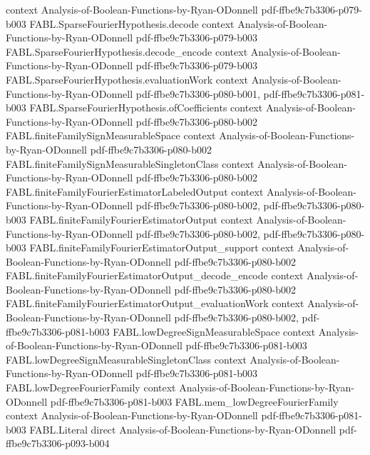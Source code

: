 \begin{theorem}
  {context}
  {Analysis-of-Boolean-Functions-by-Ryan-ODonnell}
  {pdf-ffbe9c7b3306-p079-b003}
\proofstep
  {FABL.SparseFourierHypothesis.decode}
  {context}
  {Analysis-of-Boolean-Functions-by-Ryan-ODonnell}
  {pdf-ffbe9c7b3306-p079-b003}
\proofstep
  {FABL.SparseFourierHypothesis.decode_encode}
  {context}
  {Analysis-of-Boolean-Functions-by-Ryan-ODonnell}
  {pdf-ffbe9c7b3306-p079-b003}
\proofstep
  {FABL.SparseFourierHypothesis.evaluationWork}
  {context}
  {Analysis-of-Boolean-Functions-by-Ryan-ODonnell}
  {pdf-ffbe9c7b3306-p080-b001,
    pdf-ffbe9c7b3306-p081-b003}
\proofstep
  {FABL.SparseFourierHypothesis.ofCoefficients}
  {context}
  {Analysis-of-Boolean-Functions-by-Ryan-ODonnell}
  {pdf-ffbe9c7b3306-p080-b002}
\proofstep
  {FABL.finiteFamilySignMeasurableSpace}
  {context}
  {Analysis-of-Boolean-Functions-by-Ryan-ODonnell}
  {pdf-ffbe9c7b3306-p080-b002}
\proofstep
  {FABL.finiteFamilySignMeasurableSingletonClass}
  {context}
  {Analysis-of-Boolean-Functions-by-Ryan-ODonnell}
  {pdf-ffbe9c7b3306-p080-b002}
\proofstep
  {FABL.finiteFamilyFourierEstimatorLabeledOutput}
  {context}
  {Analysis-of-Boolean-Functions-by-Ryan-ODonnell}
  {pdf-ffbe9c7b3306-p080-b002,
    pdf-ffbe9c7b3306-p080-b003}
\proofstep
  {FABL.finiteFamilyFourierEstimatorOutput}
  {context}
  {Analysis-of-Boolean-Functions-by-Ryan-ODonnell}
  {pdf-ffbe9c7b3306-p080-b002,
    pdf-ffbe9c7b3306-p080-b003}
\proofstep
  {FABL.finiteFamilyFourierEstimatorOutput_support}
  {context}
  {Analysis-of-Boolean-Functions-by-Ryan-ODonnell}
  {pdf-ffbe9c7b3306-p080-b002}
\proofstep
  {FABL.finiteFamilyFourierEstimatorOutput_decode_encode}
  {context}
  {Analysis-of-Boolean-Functions-by-Ryan-ODonnell}
  {pdf-ffbe9c7b3306-p080-b002}
\proofstep
  {FABL.finiteFamilyFourierEstimatorOutput_evaluationWork}
  {context}
  {Analysis-of-Boolean-Functions-by-Ryan-ODonnell}
  {pdf-ffbe9c7b3306-p080-b002,
    pdf-ffbe9c7b3306-p081-b003}
\proofstep
  {FABL.lowDegreeSignMeasurableSpace}
  {context}
  {Analysis-of-Boolean-Functions-by-Ryan-ODonnell}
  {pdf-ffbe9c7b3306-p081-b003}
\proofstep
  {FABL.lowDegreeSignMeasurableSingletonClass}
  {context}
  {Analysis-of-Boolean-Functions-by-Ryan-ODonnell}
  {pdf-ffbe9c7b3306-p081-b003}
\proofstep
  {FABL.lowDegreeFourierFamily}
  {context}
  {Analysis-of-Boolean-Functions-by-Ryan-ODonnell}
  {pdf-ffbe9c7b3306-p081-b003}
\proofstep
  {FABL.mem_lowDegreeFourierFamily}
  {context}
  {Analysis-of-Boolean-Functions-by-Ryan-ODonnell}
  {pdf-ffbe9c7b3306-p081-b003}
\proofstep
  {FABL.Literal}
  {direct}
  {Analysis-of-Boolean-Functions-by-Ryan-ODonnell}
  {pdf-ffbe9c7b3306-p093-b004}

\end{theorem}
